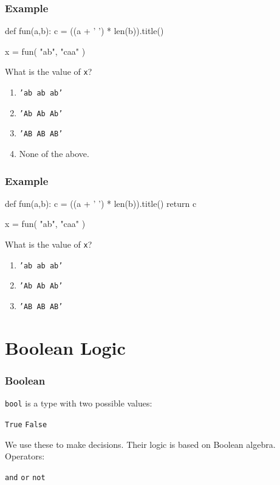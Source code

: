 \documentclass[11pt]{beamer}
\begin{document}
\begin{frame}[fragile]
  \frametitle{Example}
  \Enlarge

  \begin{semiverbatim}
def fun(a,b):
    c = ((a + ' ') * len(b)).title()

x = fun( "ab", "caa" )
  \end{semiverbatim}
  What is the value of \texttt{x}?
  \begin{enumerate}[label=\Alph*]
  \item  \texttt{'ab ab ab'}
  \item  \texttt{'Ab Ab Ab'}
  \item  \texttt{'AB AB AB'}
  \item  None of the above.
  \end{enumerate}
\end{frame}

\begin{frame}[fragile]
  \frametitle{Example}
  \Enlarge

  \begin{semiverbatim}
def fun(a,b):
    c = ((a + ' ') * len(b)).title()
    return c

x = fun( "ab", "caa" )
  \end{semiverbatim}
  What is the value of \texttt{x}?
  \begin{enumerate}[label=\Alph*]
  \item  \texttt{'ab ab ab'}
  \item  \texttt{'Ab Ab Ab'}
  \item  \texttt{'AB AB AB'}
  \end{enumerate}
\end{frame}

\section{Boolean Logic}

\begin{frame}[fragile]
  \frametitle{Boolean}
  \Enlarge

  \begin{itemize}
  \myitem  \texttt{bool} is a type with two possible values:
    \begin{itemize}
    \mysubitem  \texttt{True}
    \mysubitem  \texttt{False}
    \end{itemize} \pause
  \myitem  We use these to make decisions.
  \myitem  Their logic is based on Boolean algebra. \pause
  \myitem  Operators:
    \begin{itemize}
    \mysubitem  \texttt{and}
    \mysubitem  \texttt{or}
    \mysubitem  \texttt{not}
    \end{itemize}
  \end{itemize}
\end{frame}
\end{document}
